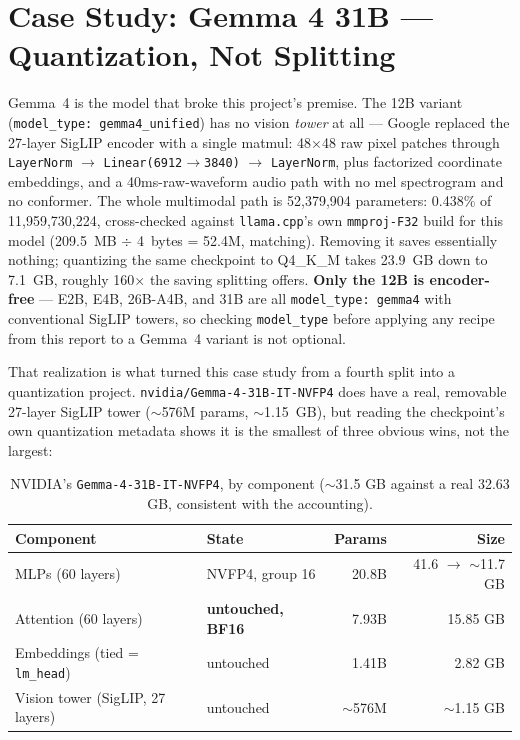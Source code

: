 \documentclass[11pt]{article}
\begin{document}
\section{Case Study: Gemma 4 31B --- Quantization, Not Splitting}
\label{sec:gemma}

Gemma~4 is the model that broke this project's premise. The 12B variant
(\texttt{model\_type: gemma4\_unified}) has no vision \emph{tower} at all --- Google
replaced the 27-layer SigLIP encoder with a single matmul: 48$\times$48 raw pixel
patches through \texttt{LayerNorm} $\to$ \texttt{Linear(6912$\to$3840)} $\to$
\texttt{LayerNorm}, plus factorized coordinate embeddings, and a 40ms-raw-waveform
audio path with no mel spectrogram and no conformer. The whole multimodal path is
52,379,904 parameters: 0.438\% of 11,959,730,224, cross-checked against
\texttt{llama.cpp}'s own \texttt{mmproj-F32} build for this model (209.5~MB $\div$
4~bytes = 52.4M, matching). Removing it saves essentially nothing; quantizing the same
checkpoint to Q4\_K\_M takes 23.9~GB down to 7.1~GB, roughly 160$\times$ the saving
splitting offers. \textbf{Only the 12B is encoder-free} --- E2B, E4B, 26B-A4B, and 31B
are all \texttt{model\_type: gemma4} with conventional SigLIP towers, so checking
\texttt{model\_type} before applying any recipe from this report to a Gemma~4 variant is
not optional.

That realization is what turned this case study from a fourth split into a
quantization project. \texttt{nvidia/Gemma-4-31B-IT-NVFP4} does have a real, removable
27-layer SigLIP tower ($\sim$576M params, $\sim$1.15~GB), but reading the checkpoint's
own quantization metadata shows it is the smallest of three obvious wins, not the
largest:

\begin{table}[h]
\centering
\small
\begin{tabular}{llrr}
\toprule
Component & State & Params & Size \\
\midrule
MLPs (60 layers) & NVFP4, group 16 & 20.8B & 41.6 $\to$ $\sim$11.7 GB \\
Attention (60 layers) & \textbf{untouched, BF16} & 7.93B & 15.85 GB \\
Embeddings (tied = \texttt{lm\_head}) & untouched & 1.41B & 2.82 GB \\
Vision tower (SigLIP, 27 layers) & untouched & $\sim$576M & $\sim$1.15 GB \\
\bottomrule
\end{tabular}
\caption{NVIDIA's \texttt{Gemma-4-31B-IT-NVFP4}, by component ($\sim$31.5 GB against a
real 32.63 GB, consistent with the accounting).}
\end{table}
\end{document}
